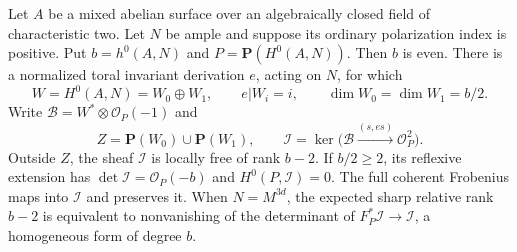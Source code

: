 \begin{lemma}
\label{lem:DE-A3-positive-index-image-candidate}
Let $A$ be a mixed abelian surface over an algebraically closed field
of characteristic two. Let $N$ be ample and suppose its ordinary
polarization index is positive. Put $b=h^0(A,N)$ and
$P=\mathbf P(H^0(A,N))$. Then $b$ is even. There is a normalized
toral invariant derivation $e$, acting on $N$, for which
\[
 W=H^0(A,N)=W_0\oplus W_1,\qquad
 e|W_i=i,\qquad\dim W_0=\dim W_1=b/2.
\]
Write $\mathcal B=W^*\otimes\mathcal O_P(-1)$ and
\[
 Z=\mathbf P(W_0)\cup\mathbf P(W_1),\qquad
 \mathcal I=\ker\bigl(\mathcal B
       \xrightarrow{(s,es)}\mathcal O_P^2\bigr).
\]
Outside $Z$, the sheaf $\mathcal I$ is locally free of rank $b-2$.
If $b/2\ge2$, its reflexive extension has
$\det\mathcal I=\mathcal O_P(-b)$ and $H^0(P,\mathcal I)=0$.
The full coherent Frobenius maps into $\mathcal I$ and preserves it.
When $N=M^{3d}$, the expected sharp relative rank $b-2$ is equivalent
to nonvanishing of the determinant of
$F_P^*\mathcal I\to\mathcal I$, a homogeneous form of degree $b$.
\end{lemma}
